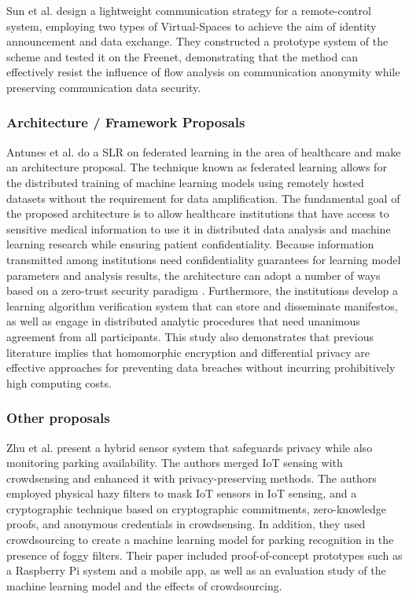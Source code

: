 \documentclass[manuscript,screen,review,natbib=false]{acmart}
\begin{document}
Sun et al. \cite{SunSecure} design a lightweight communication strategy
for a remote-control system, employing two types of Virtual-Spaces to achieve
the aim of identity announcement and data exchange. They constructed a prototype
system of the scheme and tested it on the Freenet, demonstrating that the
method can effectively resist the influence of flow analysis on communication
anonymity while preserving communication data security.

\subsubsection{Architecture / Framework Proposals}

Antunes et al. \cite{AntunesFederated} do a SLR on federated learning in
the area of healthcare and make an architecture proposal. The technique
known as federated learning allows for the distributed training of machine
learning models using remotely hosted datasets without the requirement for
data amplification. The fundamental goal of the proposed architecture is
to allow healthcare institutions that have access to sensitive medical information
to use it in distributed data analysis and machine learning research while
ensuring patient confidentiality. Because information transmitted among
institutions need confidentiality guarantees for learning model parameters
and analysis results, the architecture can adopt a number of ways based on
a zero-trust security paradigm \cite{ChenSecurity}. Furthermore, the institutions
develop a learning algorithm verification system that can store and disseminate
manifestos, as well as engage in distributed analytic procedures that need
unanimous agreement from all participants. This study also demonstrates
that previous literature implies that homomorphic encryption and differential
privacy are effective approaches for preventing data breaches without incurring
prohibitively high computing costs.

\subsubsection{Other proposals}

Zhu et al. \cite{ZhuIntegrating} present a hybrid sensor system that safeguards
privacy while also monitoring parking availability. The authors merged IoT
sensing with crowdsensing and enhanced it with privacy-preserving methods.
The authors employed physical hazy filters to mask IoT sensors in IoT sensing,
and a cryptographic technique based on cryptographic commitments, zero-knowledge
proofs, and anonymous credentials in crowdsensing. In addition, they used
crowdsourcing to create a machine learning model for parking recognition
in the presence of foggy filters. Their paper included proof-of-concept
prototypes such as a Raspberry Pi system and a mobile app, as well as an
evaluation study of the machine learning model and the effects of crowdsourcing.
\end{document}
